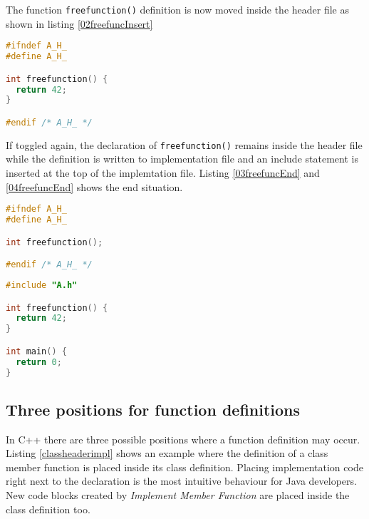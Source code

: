 The function \texttt{freefunction()} definition is now moved inside the header
file as shown in listing \nolinebreak\ref{02freefuncInsert}

\begin{lstlisting}[caption={Inserted freefunction in A.h},
label={02freefuncInsert}, language=C++]
#ifndef A_H_
#define A_H_

int freefunction() {
  return 42;
}

#endif /* A_H_ */
\end{lstlisting}

If toggled again, the declaration of \texttt{freefunction()} remains inside the
header file while the definition is written to implementation file and an
include statement is inserted at the top of the implemtation file. Listing
\nolinebreak\ref{03freefuncEnd} and \ref{04freefuncEnd} shows the end
situation.

\begin{lstlisting}[caption={Inserted freefunction in A.h},
label={03freefuncEnd}, language=C++]
#ifndef A_H_
#define A_H_

int freefunction();

#endif /* A_H_ */
\end{lstlisting}

\begin{lstlisting}[caption={A.cpp},label={04freefuncEnd},language=C++]
#include "A.h"

int freefunction() {
  return 42;
}

int main() {
  return 0;
}
\end{lstlisting}

\subsection{Three positions for function definitions}

\label{positions}
In C++ there are three possible positions where a 
function definition may occur. Listing \ref{classheaderimpl} shows an example
where the definition of a class member function is placed inside its class
definition. Placing implementation code right next to the declaration is the
most intuitive behaviour for Java developers. New code blocks created by
\textit{Implement Member Function} are placed inside the class definition too.



